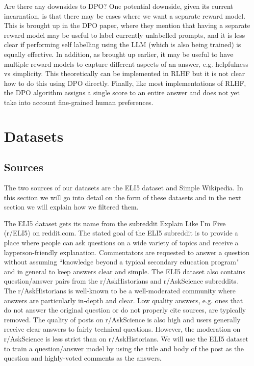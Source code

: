 \documentclass[11pt, oneside]{article}   	%
\begin{document}
Are there any downsides to DPO?
One potential downside, given its current incarnation, is that there may be cases where we want a separate reward model.
This is brought up in the DPO paper, where they mention that having a separate reward model may be useful to label currently unlabelled prompts, and it is less clear if performing self labelling using the LLM (which is also being trained) is equally effective.
In addition, as brought up earlier, it may be useful to have multiple reward models to capture different aspects of an answer, e.g. helpfulness vs simplicity. 
This theoretically can be implemented in RLHF but it is not clear how to do this using DPO directly.
Finally, like most implementations of RLHF, the DPO algorithm assigns a single score to an entire answer and does not yet take into account fine-grained human preferences.

\section{Datasets}
\subsection{Sources}
The two sources of our datasets are the ELI5 dataset and Simple Wikipedia.
In this section we will go into detail on the form of these datasets and in the next section we will explain how we filtered them. 

The ELI5 dataset gets its name from the subreddit Explain Like I'm Five (r/ELI5) on reddit.com.
The stated goal of the ELI5 subreddit is to provide a place where people can ask questions on a wide variety of topics and receive a layperson-friendly explanation.
Commentators are requested to answer a question without assuming ``knowledge beyond a typical secondary education program" and in general to keep answers clear and simple.
The ELI5 dataset also contains question/answer pairs from the r/AskHistorians and r/AskScience subreddits. The r/AskHistorians is well-known to be a well-moderated community where answers are particularly in-depth and clear. 
Low quality answers, e.g. ones that do not answer the original question or do not properly cite sources, are typically removed.
The quality of posts on r/AskScience is also high and users generally receive clear answers to fairly technical questions.
However, the moderation on r/AskScience is less strict than on r/AskHistorians.
We will use the ELI5 dataset to train a question/answer model by using the title and body of the post as the question and highly-voted comments as the answers.
\end{document}
